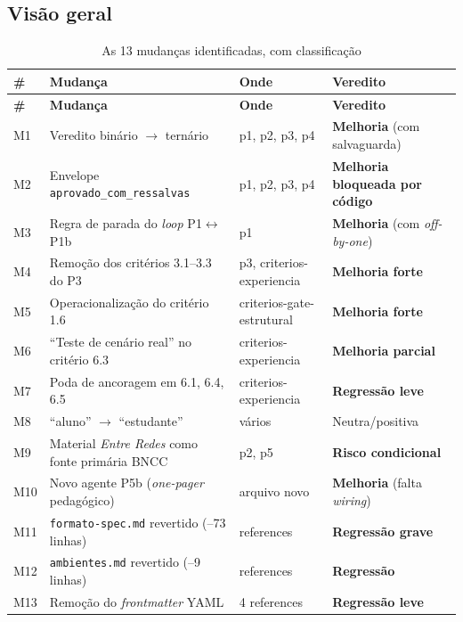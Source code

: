 \documentclass[11pt,a4paper]{article}
\newcommand{\Verde}[1]{\textcolor{verde}{\textbf{#1}}}
\newcommand{\Ambar}[1]{\textcolor{ambar}{\textbf{#1}}}
\newcommand{\Vermelho}[1]{\textcolor{vermelho}{\textbf{#1}}}
\newcommand{\cod}[1]{\texttt{\small #1}}
\begin{document}
\subsection{Visão geral}

\begin{longtable}{p{0.6cm}p{6.1cm}p{3.2cm}p{4.6cm}}
\caption{As 13 mudanças identificadas, com classificação}\label{tab:mudancas}\\
\toprule
\textbf{\#} & \textbf{Mudança} & \textbf{Onde} & \textbf{Veredito} \\
\midrule
\endfirsthead
\toprule
\textbf{\#} & \textbf{Mudança} & \textbf{Onde} & \textbf{Veredito} \\
\midrule
\endhead
M1 & Veredito binário $\rightarrow$ ternário & p1, p2, p3, p4 & \Verde{Melhoria} (com salvaguarda) \\
M2 & Envelope \cod{aprovado\_com\_ressalvas} & p1, p2, p3, p4 & \Ambar{Melhoria bloqueada por código} \\
M3 & Regra de parada do \textit{loop} P1$\leftrightarrow$P1b & p1 & \Verde{Melhoria} (com \textit{off-by-one}) \\
M4 & Remoção dos critérios 3.1--3.3 do P3 & p3, criterios-experiencia & \Verde{Melhoria forte} \\
M5 & Operacionalização do critério 1.6 & criterios-gate-estrutural & \Verde{Melhoria forte} \\
M6 & ``Teste de cenário real'' no critério 6.3 & criterios-experiencia & \Ambar{Melhoria parcial} \\
M7 & Poda de ancoragem em 6.1, 6.4, 6.5 & criterios-experiencia & \Vermelho{Regressão leve} \\
M8 & ``aluno'' $\rightarrow$ ``estudante'' & vários & Neutra/positiva \\
M9 & Material \textit{Entre Redes} como fonte primária BNCC & p2, p5 & \Ambar{Risco condicional} \\
M10 & Novo agente P5b (\textit{one-pager} pedagógico) & arquivo novo & \Verde{Melhoria} (falta \textit{wiring}) \\
M11 & \cod{formato-spec.md} revertido (--73 linhas) & references & \Vermelho{Regressão grave} \\
M12 & \cod{ambientes.md} revertido (--9 linhas) & references & \Vermelho{Regressão} \\
M13 & Remoção do \textit{frontmatter} YAML & 4 references & \Vermelho{Regressão leve} \\
\bottomrule
\end{longtable}
\end{document}
